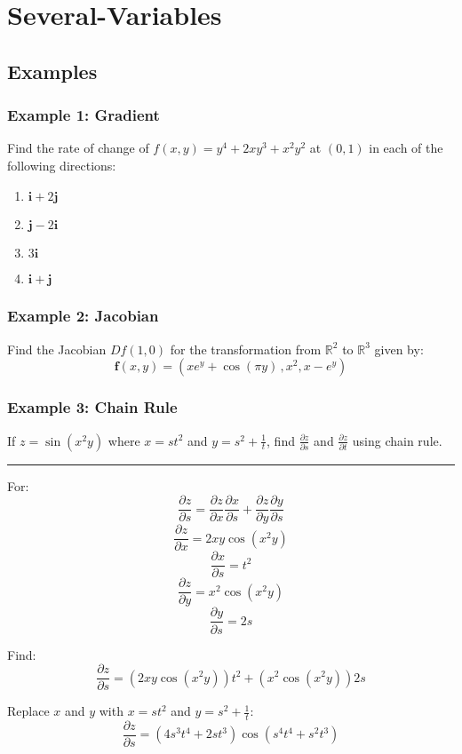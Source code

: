 \section{Several-Variables}

\subsection{Examples}
\subsubsection{Example 1: Gradient}
Find the rate of change of $f(x,y)=y^4+2xy^3+x^2y^2$ at $(0,1)$ in each of the following directions:
\begin{enumerate}
  \item $\mathbf{i}+2\mathbf{j}$
  \item $\mathbf{j}-2\mathbf{i}$
  \item $3\mathbf{i}$
  \item $\mathbf{i}+\mathbf{j}$
\end{enumerate}

\subsubsection{Example 2: Jacobian}
Find the Jacobian $Df(1,0)$ for the transformation from $\mathbb{R}^2$ to $\mathbb{R}^3$ given by:
$$\mathbf{f}(x,y)=(x e^{y}+\cos(\pi y)\,,x^{2},x-e^{y})$$

\subsubsection{Example 3: Chain Rule}
If $z=\sin(x^2y)$ where $x=st^2$ and $y=s^2+\frac{1}{t}$, find $\frac{\partial z}{\partial s}$ and $\frac{\partial z}{\partial t}$ using chain rule.

\rule{\textwidth}{0.5pt}

For: 
$${\frac{\partial z}{\partial s}}={\frac{\partial z}{\partial x}}{\frac{\partial x}{\partial s}}+{\frac{\partial z}{\partial y}}{\frac{\partial y}{\partial s}}$$
$${\frac{\partial z}{\partial x}}=2xy\cos(x^2y)$$
$${\frac{\partial x}{\partial s}}=t^2$$
$${\frac{\partial z}{\partial y}}=x^2\cos(x^2y)$$
$${\frac{\partial y}{\partial s}}=2s$$

Find:
$${\frac{\partial z}{\partial s}}=(2xy\cos(x^2y))t^2+(x^2\cos(x^2y))2s$$

Replace $x$ and $y$ with $x=st^2$ and $y=s^2+\frac{1}{t}$:
$$\frac{\partial z}{\partial s}=(4s^3t^4+2st^3)\cos(s^4t^4+s^2t^3)$$

